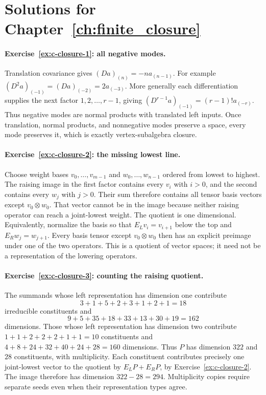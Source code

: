 \section{Solutions for Chapter~\ref{ch:finite_closure}}

\paragraph{Exercise~\ref{ex:c-closure-1}: all negative modes.}
\label{sol:ex:c-closure-1}
Translation covariance gives $(Da)_{(n)}=-n a_{(n-1)}$.
For example $(D^2a)_{(-1)}=(Da)_{(-2)}=2a_{(-3)}$.
More generally each differentiation supplies the next factor
$1,2,\ldots,r-1$, giving
$(D^{r-1}a)_{(-1)}=(r-1)!a_{(-r)}$. Thus negative modes are
normal products with translated left inputs. Once translation, normal
products, and nonnegative modes preserve a space, every mode preserves
it, which is exactly vertex-subalgebra closure.



\paragraph{Exercise~\ref{ex:c-closure-2}: the missing lowest line.}
\label{sol:ex:c-closure-2}
Choose weight bases $v_0,\ldots,v_{m-1}$ and
$w_0,\ldots,w_{n-1}$ ordered from lowest to highest. The raising
image in the first factor contains every $v_i$ with $i>0$, and
the second contains every $w_j$ with $j>0$. Their sum therefore
contains all tensor basis vectors except $v_0\otimes w_0$.
That vector cannot be in the image because neither raising operator
can reach a joint-lowest weight. The quotient is one dimensional.
Equivalently, normalize the basis so that $E_Lv_i=v_{i+1}$
below the top and $E_Rw_j=w_{j+1}$. Every basis tensor except
$v_0\otimes w_0$ then has an explicit preimage under one of the
two operators. This is a quotient of vector spaces; it need not
be a representation of the lowering operators.



\paragraph{Exercise~\ref{ex:c-closure-3}: counting the raising quotient.}
\label{sol:ex:c-closure-3}
The summands whose left representation has dimension one contribute
\[
 3+1+5+2+3+1+2+1=18
\]
irreducible constituents and
\[
 9+5+35+18+33+13+30+19=162
\]
dimensions. Those whose left representation has dimension two
contribute $1+1+2+2+2+1+1=10$ constituents and
$4+8+24+32+40+24+28=160$ dimensions. Thus $P$ has dimension
$322$ and $28$ constituents, with multiplicity. Each constituent
contributes precisely one joint-lowest vector to the quotient by
$E_LP+E_RP$, by Exercise~\ref{ex:c-closure-2}. The image therefore
has dimension $322-28=294$. Multiplicity copies require separate
seeds even when their representation types agree.



